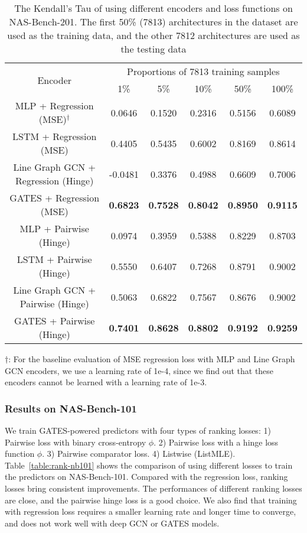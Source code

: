 \documentclass[runningheads]{llncs}
\begin{document}
\addtolength{\tabcolsep}{1pt}
\begin{table*}[tb]
\caption{The Kendall’s Tau of using different encoders and loss functions on NAS-Bench-201. The first 50\% (7813) architectures in the dataset are used as the training data, and the other 7812 architectures are used as the testing data}
\label{table:gates-nb201}
\begin{center}

\begin{tabular}{cccccc}
\toprule
\multirow{2}{*}{Encoder} & \multicolumn{5}{c}{Proportions of 7813 training samples}\\ 
\cmidrule(lr){2-6} & 1\% & 5\% & 10\% & 50\% & 100\% \\\midrule
MLP + Regression (MSE)$^\dagger$ & 0.0646 & 0.1520 & 0.2316 & 0.5156 & 0.6089  \\
  LSTM + Regression (MSE) & 0.4405 & 0.5435 & 0.6002 & 0.8169 & 0.8614\\
  Line Graph GCN + Regression (Hinge) &  -0.0481 &  0.3376 & 0.4988 & 0.6609 & 0.7006\\
GATES + Regression (MSE) & {\bf 0.6823} & {\bf 0.7528} & {\bf 0.8042} & {\bf 0.8950} & {\bf 0.9115}\\\hline
MLP + Pairwise (Hinge)  &  0.0974 & 0.3959 & 0.5388 & 0.8229 & 0.8703\\
  LSTM + Pairwise (Hinge) & 0.5550 & 0.6407 & 0.7268 & 0.8791 & 0.9002\\
  Line Graph GCN + Pairwise (Hinge) &   0.5063 & 0.6822 & 0.7567 & 0.8676 & 0.9002 \\ GATES + Pairwise (Hinge) & {\bf 0.7401} & {\bf 0.8628} & {\bf 0.8802} & {\bf 0.9192} & {\bf 0.9259}\\\bottomrule

\end{tabular}
\begin{minipage}{1.0\textwidth}
$\dagger$: For the baseline evaluation of MSE regression loss with MLP and Line Graph GCN encoders, we use a learning rate of 1e-4, since we find out that these encoders cannot be learned with a learning rate of 1e-3.
\end{minipage}
\end{center}
\end{table*}
\addtolength{\tabcolsep}{-1pt}

\subsubsection{Results on NAS-Bench-101}
We train GATES-powered predictors with four types of ranking losses: 1) Pairwise loss with binary cross-entropy $\phi$. 2) Pairwise loss with a hinge loss function $\phi$. 3) Pairwise comparator loss. 4) Listwise (ListMLE).
Table~\ref{table:rank-nb101} shows the comparison of using different losses to train the predictors on NAS-Bench-101. Compared with the regression loss, ranking losses bring consistent improvements.
The performances of different ranking losses are close, and the pairwise hinge loss is a good choice. We also find that training with regression loss requires a smaller learning rate and longer time to converge, and does not work well with 
deep GCN or GATES models.
\end{document}
